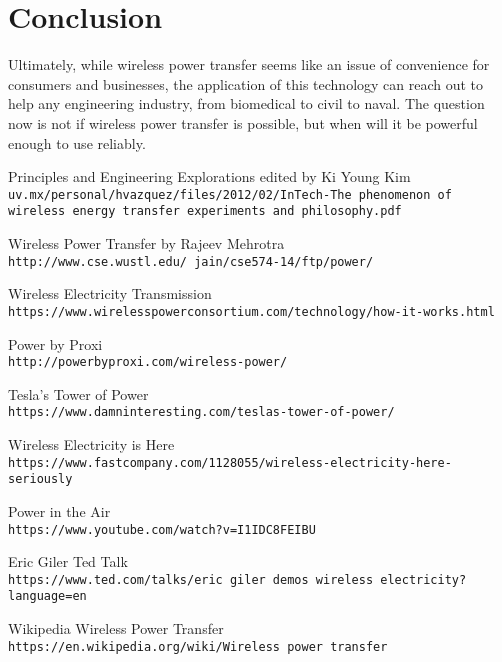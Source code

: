 \documentclass{article}
\begin{document}
\section{Conclusion}
Ultimately, while wireless power transfer seems like an issue of convenience for consumers and businesses, the application of this technology can reach out to help any engineering industry, from biomedical to civil to naval. The question now is not if wireless power transfer is possible, but when will it be powerful enough to use reliably.

\begin{thebibliography}{9}
Principles and Engineering Explorations edited by Ki Young Kim 
\\\texttt{uv.mx/personal/hvazquez/files/2012/02/InTech-The phenomenon of wireless energy transfer experiments and philosophy.pdf} 
 
Wireless Power Transfer by Rajeev Mehrotra 
\\\texttt{http://www.cse.wustl.edu/~jain/cse574-14/ftp/power/}

Wireless Electricity Transmission
\\\texttt{https://www.wirelesspowerconsortium.com/technology/how-it-works.html}

Power by Proxi
\\\texttt{http://powerbyproxi.com/wireless-power/}

Tesla’s Tower of Power
\\\texttt{https://www.damninteresting.com/teslas-tower-of-power/}

Wireless Electricity is Here
\\\texttt{https://www.fastcompany.com/1128055/wireless-electricity-here-seriously}

Power in the Air
\\\texttt{https://www.youtube.com/watch?v=I1IDC8FEIBU}

Eric Giler Ted Talk
\\\texttt{https://www.ted.com/talks/eric giler demos wireless electricity?language=en}

Wikipedia Wireless Power Transfer
\\\texttt{https://en.wikipedia.org/wiki/Wireless power transfer}
\end{thebibliography}
\end{document}

